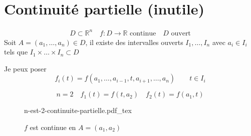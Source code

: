 \documentclass[a4paper]{report}
\newcommand\R{\ensuremath{\mathbb{R}}}
\theoremstyle{definition}
\newcommand{\incfig}[1]{%
    \def\svgwidth{\columnwidth}
    {#1.pdf_tex}
}
\begin{document}
\section{Continuité partielle (inutile)}
\begin{align*}
    D \subset \R^n  \quad f: D \to \R \text{ continue} \quad D \text{ ouvert}
\end{align*}
Soit  $A = (a_1, \ldots, a_n) \in D$, il existe des intervalles ouverts $I_1, \ldots, I_n$ avec $a_i \in I_i$ tels que $I_1 \times \ldots \times I_n \subset D$ 
\par
Je peux poser 
\[
f_i(t) = f(a_1, \ldots, a_{i-1}, t, a_{i+1}, \ldots, a_n) \qquad t \in I_i
\] 
\begin{eg}
   \[
   n = 2 \quad f_1(t) = f(t, a_2) \quad f_2(t) = f(a_1, t)
   \]  
\begin{figure}[H]
    \centering
    \incfig{n-est-2-continuite-partielle}
    \caption{$f$ est continue en  $A = (a_1, a_2)$}
    \label{fig:n-est-2-continuite-partielle}
\end{figure}
\end{eg}
\end{document}
